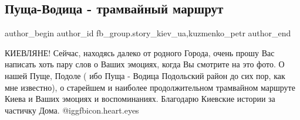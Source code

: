  
 
 
 
 
 
\subsection{Пуща-Водица - трамвайный маршрут}
\label{sec:18_02_2021.fb.fb_group.story_kiev_ua.2.puscha_vodica_tramvaj_marshrut}
 
\ifcmt
 author_begin
   author_id fb_group.story_kiev_ua,kuzmenko_petr
 author_end
\fi


КИЕВЛЯНЕ! Сейчас, находясь далеко от родного Города, очень прошу Вас написать
хоть пару слов о Ваших эмоциях, когда Вы смотрите на это фото. О нашей Пуще,
Подоле ( ибо Пуща - Водица Подольский район до сих пор, как мне известно), о
старейшем и наиболее продолжительном трамвайном маршруте Киева и Ваших эмоциях
и воспоминаниях. Благодарю Киевские истории за частичку Дома. @igg{fbicon.heart.eyes} 

